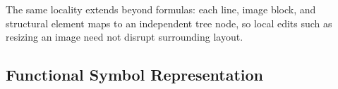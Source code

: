 The same locality extends beyond formulas: each line, image block, and structural element maps to an independent tree node, so local edits such as resizing an image need not disrupt surrounding layout.
%
%
%

\subsection{Functional Symbol Representation}


